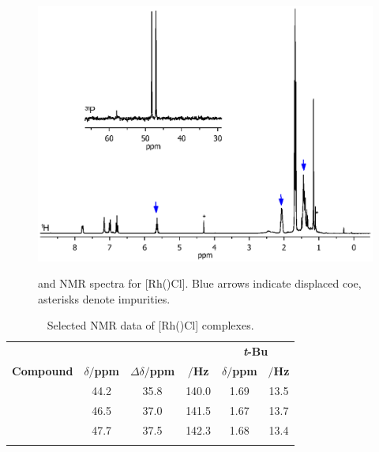 \begin{figure}[htbp]
\begin{center}
\vspace{0.5cm}
\includegraphics[trim = 2.5cm 4.0cm 2.5cm 15cm, clip]{../NMR/7004B.eps}
\caption[\phosphorus{} and \proton{} NMR spectra for [Rh(\tBuxantphos)Cl{]}]{\phosphorus{} and \proton{} NMR spectra for [Rh(\tBuxantphos)Cl].  Blue arrows indicate displaced \acrshort{coe}, asterisks denote impurities.}
\vspace{0.2cm}
\label{RhClnmr}
\end{center}
\end{figure}
\vspace{0.2cm}

\begin{table}[htbp]
\caption[Selected NMR data of [Rh(\tBuxantphos)Cl{]} complexes]{Selected NMR data of [Rh(\tBuxantphos)Cl] complexes.}
\vspace{1em}
\label{table:rhodiumchloride}
\small
\begin{center}
\begin{tabular}{ c c c c c c}
	\toprule{}
	~ & \multicolumn{3}{c}{\bfseries{\phosphorus}} & \multicolumn{2}{c}{\bfseries{\proton{} \emph{t}-Bu}}\\
	\cmidrule(lr){2-4} \cmidrule(lr){5-6} 
	\bfseries{Compound}&\bfseries{$\delta/$ppm}&\bfseries{$\Delta\delta/$ppm}&\bfseries{\JRhP{}$/$Hz}&\bfseries{$\delta/$ppm}&\bfseries{\J $/$Hz}\\
	\midrule{}
	\tBuSixantphos		&	44.2	&	35.8	&	140.0	& 1.69	& 13.5\\
	\tBuThixantphos	& 	46.5	&	37.0	&	141.5	& 1.67	& 13.7\\
	\tBuXantphos		&	47.7	&	37.5	&	142.3	& 1.68	& 13.4\\
	\bottomrule{}
\end{tabular}
\end{center}
\end{table}

